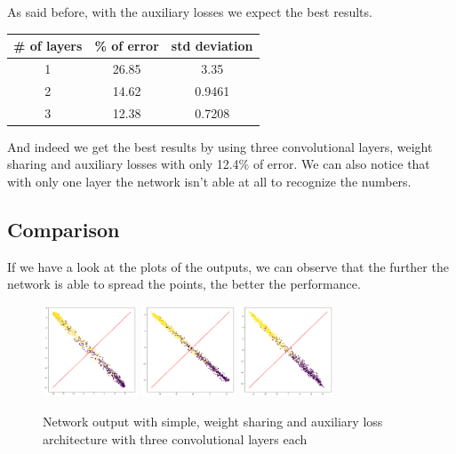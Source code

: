 \documentclass{article}
\begin{document}
As said before, with the auxiliary losses we expect the best results.

\begin{center}
\begin{tabular}{|c|c|c|}
\hline 
\# of layers & \% of error & std deviation \\ 
\hline 
1 & 26.85 & 3.35 \\ 
\hline 
2 & 14.62 & 0.9461 \\ 
\hline 
3 & 12.38 & 0.7208 \\ 
\hline 
\end{tabular}
\end{center}

And indeed we get the best results by using three convolutional layers, weight sharing and auxiliary losses with only 12.4\% of error. We can also notice that with only one layer the network isn't able at all to recognize the numbers. 

\subsection{Comparison}

If we have a look at the plots of the outputs, we can observe that the further the network is able to spread the points, the better the performance. 

\begin{figure}[H]
\begin{center}
\includegraphics[width=0.25\textwidth]{simple_conv3}
\includegraphics[width=0.25\textwidth]{ws_conv3}
\includegraphics[width=0.25\textwidth]{al_conv3}
\caption{Network output with simple, weight sharing and auxiliary loss architecture with three convolutional layers each}
\end{center}
\end{figure}
\end{document}

